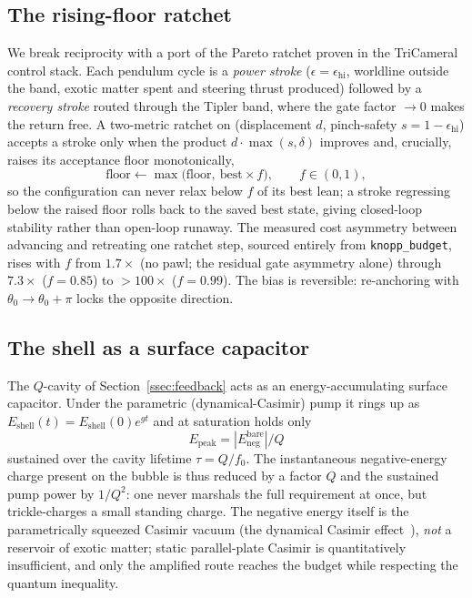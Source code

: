 \documentclass[11pt,a4paper]{article}
\begin{document}
\subsection{The rising-floor ratchet}
We break reciprocity with a port of the Pareto ratchet proven in the TriCameral control stack. Each pendulum cycle is a \emph{power stroke} ($\epsilon=\epsilon_{\mathrm{hi}}$, worldline outside the band, exotic matter spent and steering thrust produced) followed by a \emph{recovery stroke} routed through the Tipler band, where the gate factor $\to0$ makes the return free. A two-metric ratchet on (displacement $d$, pinch-safety $s=1-\epsilon_{\mathrm{hi}}$) accepts a stroke only when the product $d\cdot\max(s,\delta)$ improves and, crucially, raises its acceptance floor monotonically,
\begin{equation}
\text{floor}\leftarrow\max\!\bigl(\text{floor},\ \text{best}\times f\bigr),\qquad f\in(0,1),
\end{equation}
so the configuration can never relax below $f$ of its best lean; a stroke regressing below the raised floor rolls back to the saved best state, giving closed-loop stability rather than open-loop runaway. The measured cost asymmetry between advancing and retreating one ratchet step, sourced entirely from \texttt{knopp\_budget}, rises with $f$ from $1.7\times$ (no pawl; the residual gate asymmetry alone) through $7.3\times$ ($f=0.85$) to $>\!100\times$ ($f=0.99$). The bias is reversible: re-anchoring with $\theta_{0}\!\to\!\theta_{0}+\pi$ locks the opposite direction.

\subsection{The shell as a surface capacitor}
The $Q$-cavity of Section~\ref{ssec:feedback} acts as an energy-accumulating surface capacitor. Under the parametric (dynamical-Casimir) pump it rings up as $E_{\mathrm{shell}}(t)=E_{\mathrm{shell}}(0)e^{gt}$ and at saturation holds only
\begin{equation}
E_{\mathrm{peak}}=|E_{\mathrm{neg}}^{\mathrm{bare}}|/Q
\end{equation}
sustained over the cavity lifetime $\tau=Q/f_{0}$. The instantaneous negative-energy charge present on the bubble is thus reduced by a factor $Q$ and the sustained pump power by $1/Q^{2}$: one never marshals the full requirement at once, but trickle-charges a small standing charge. The negative energy itself is the parametrically squeezed Casimir vacuum (the dynamical Casimir effect~\cite{Wilson2011}), \emph{not} a reservoir of exotic matter; static parallel-plate Casimir is quantitatively insufficient, and only the amplified route reaches the budget while respecting the quantum inequality.
\end{document}
